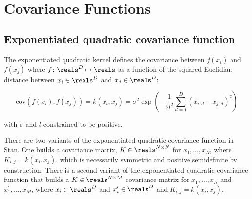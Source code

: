 \section{Covariance Functions}\label{covariance.section}

\subsection{Exponentiated quadratic covariance function}

The exponentiated quadratic kernel defines the covariance between $f(x_i)$ and
$f(x_j)$ where $f\colon \reals^D \mapsto \reals$ as a function of the squared
Euclidian distance between $x_i \in \reals^D$ and $x_j \in \reals^D$:

\[
  \text{cov}(f(x_i), f(x_j)) = k(x_i, x_j) 
= \sigma^2 
\exp \left(
	- \dfrac{1}{2l^2} \sum_{d=1}^D (x_{i,d} - x_{j,d})^2
\right)
\]

\noindent with $\sigma$ and $l$ constrained to be positive.

There are two variants of the exponentiated quadratic covariance function in
Stan. One builds a covariance matrix, $K \in \reals^{N \times N}$ for $x_1,
\dots, x_N$, where $K_{i,j} = k(x_i, x_j)$, which is necessarily symmetric and
positive semidefinite by construction. There is a second variant of the
exponentiated quadratic covariance function that builds a $K \in \reals^{N
\times M}$ covariance matrix for $x_1, \dots, x_N$ and $x^\prime_1, \dots,
x^\prime_M$, where $x_i \in \reals^D$ and $x^\prime_i \in \reals^D$ and
$K_{i,j} = k(x_i, x^\prime_j)$.

\begin{description}
%






\end{description}

